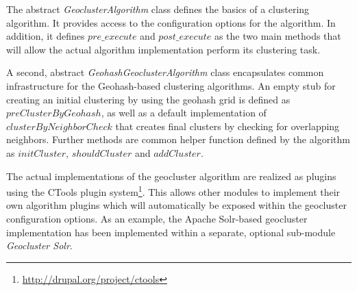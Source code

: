 The abstract \textit{GeoclusterAlgorithm} class defines the basics of a clustering algorithm. It provides access to the configuration options for the algorithm. In addition, it defines $pre\_execute$ and $post\_execute$ as the two main methods that will allow the actual algorithm implementation perform its clustering task.

A second, abstract \textit{GeohashGeoclusterAlgorithm} class encapsulates common infrastructure for the Geohash-based clustering algorithms. An empty stub for creating an initial clustering by using the geohash grid is defined as $preClusterByGeohash$, as well as a default implementation of $clusterByNeighborCheck$ that creates final clusters by checking for overlapping neighbors. Further methods are common helper function defined by the algorithm as $initCluster$, $shouldCluster$ and $addCluster$.

The actual implementations of the geocluster algorithm are realized as plugins using the CTools plugin system\footnote{\url{http://drupal.org/project/ctools}}. This allows other modules to implement their own algorithm plugins which will automatically be exposed within the geocluster configuration options. As an example, the Apache Solr-based geocluster implementation has been implemented within a separate, optional sub-module \textit{Geocluster Solr}. 

